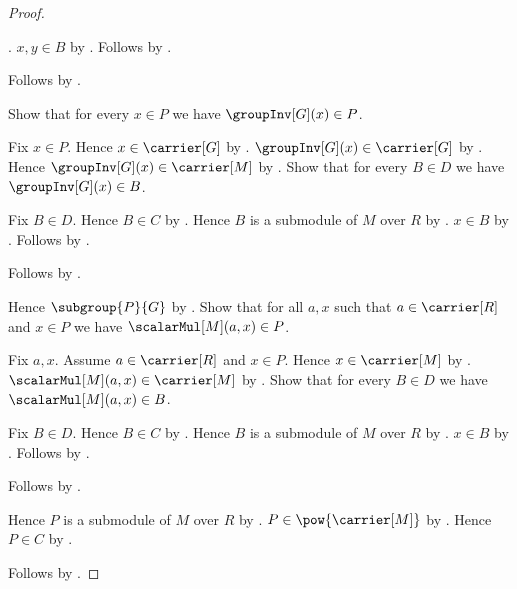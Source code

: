 \begin{proof}
\begin{subproof}
\begin{subproof}
\begin{subproof}
                    \auto.
                $x,y\in B$ by .
                Follows by
                    .
            \end{subproof}
            Follows by .
        \end{subproof}
        Show that for every $x\in P$ we have $\groupInv[G](x)\in P$.
        \begin{subproof}
            Fix $x\in P$.
            Hence $x\in\carrier[G]$ by .
            $\groupInv[G](x)\in\carrier[G]$ by
                .
            Hence $\groupInv[G](x)\in\carrier[M]$ by
                .
            Show that for every $B\in D$ we have $\groupInv[G](x)\in B$.
            \begin{subproof}
                Fix $B\in D$.
                Hence $B\in C$ by .
                Hence $B$ is a submodule of $M$ over $R$ by
                    \auto.
                $x\in B$ by .
                Follows by
                    .
            \end{subproof}
            Follows by .
        \end{subproof}
        Hence $\subgroup{P}{G}$ by .
        Show that for all $a,x$ such that $a\in\carrier[R]$ and $x\in P$
            we have $\scalarMul[M](a,x)\in P$.
        \begin{subproof}
            Fix $a,x$.
            Assume $a\in\carrier[R]$ and $x\in P$.
            Hence $x\in\carrier[M]$ by .
            $\scalarMul[M](a,x)\in\carrier[M]$ by
                .
            Show that for every $B\in D$ we have
                $\scalarMul[M](a,x)\in B$.
            \begin{subproof}
                Fix $B\in D$.
                Hence $B\in C$ by .
                Hence $B$ is a submodule of $M$ over $R$ by
                    \auto.
                $x\in B$ by .
                Follows by .
            \end{subproof}
            Follows by .
        \end{subproof}
        Hence $P$ is a submodule of $M$ over $R$ by
            .
        $P\in\pow{\carrier[M]}$ by .
        Hence $P\in C$ by \auto.
    \end{subproof}
    Follows by .
\end{proof}

